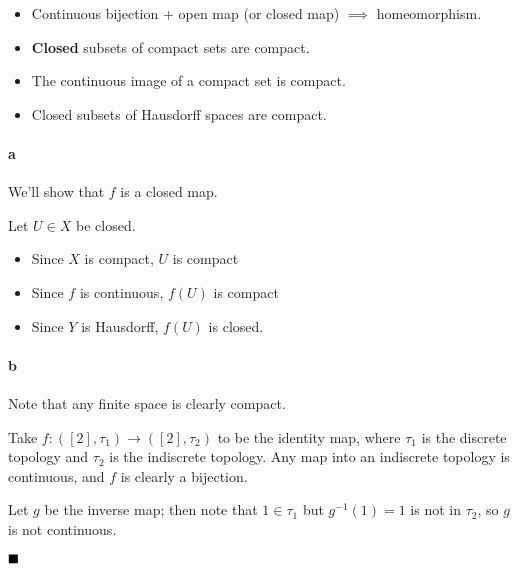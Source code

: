 \begin{solution}

\hfill

\begin{concept}

\hfill

\begin{itemize}
\tightlist
\item
  Continuous bijection + open map (or closed map) \(\implies\)
  homeomorphism.
\item
  \textbf{Closed} subsets of compact sets are compact.
\item
  The continuous image of a compact set is compact.
\item
  Closed subsets of Hausdorff spaces are compact.
\end{itemize}

\end{concept}

\hypertarget{a-8}{%
\paragraph{a}\label{a-8}}

We'll show that \(f\) is a closed map.

Let \(U \in X\) be closed.

\begin{itemize}
\tightlist
\item
  Since \(X\) is compact, \(U\) is compact
\item
  Since \(f\) is continuous, \(f(U)\) is compact
\item
  Since \(Y\) is Hausdorff, \(f(U)\) is closed.
\end{itemize}

\hypertarget{b-8}{%
\paragraph{b}\label{b-8}}

Note that any finite space is clearly compact.

Take \(f: ([2], \tau_1) \to ([2], \tau_2)\) to be the identity map,
where \(\tau_1\) is the discrete topology and \(\tau_2\) is the
indiscrete topology. Any map into an indiscrete topology is continuous,
and \(f\) is clearly a bijection.

Let \(g\) be the inverse map; then note that \(1 \in \tau_1\) but
\(g^{-1}(1) = 1\) is not in \(\tau_2\), so \(g\) is not continuous.

\(\hfill\blacksquare\)

\end{solution}

